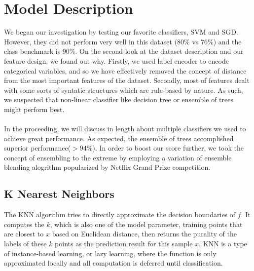 \documentclass[conference]{IEEEtran}
\begin{document}
\newcommand{\vh}{\mathbf{h}}

\section{Model Description}
We began our investigation by testing our favorite classifiers, SVM and SGD. However, they did not perform very well in this dataset (80\% vs 76\%) and the class benchmark is 90\%. On the second look at the dataset description and our feature design, we found out why. Firstly, we used label encoder to encode categorical variables, and so we have effectively removed the concept of distance from the most important features of the dataset. Secondly, most of features dealt with some sorts of syntatic structures which are rule-based by nature. As such, we suspected that non-linear classifier like decision tree or ensemble of trees might perform best. \\ \\
In the proceeding, we will discuss in length about multiple classifiers we used to achieve great performance. As expected, the ensemble of trees accomplished superior performance($> 94$\%). In order to boost our score further, we took the concept of ensembling to the extreme by employing a variation of ensemble blending alogrithm popularized by Netflix Grand Prize competition.

\subsection{K Nearest Neighbors}
The KNN algorithm tries to directly approximate the decision boundaries of $f$. It computes the $k$, which is also one of the model parameter, training points that are closest to $x$ based on Euclidean distance, then returns the purality of the labels of these $k$ points as the prediction result for this sample $x$. KNN is a type of instance-based learning, or lazy learning, where the function is only approximated locally and all computation is deferred until classification.
\end{document}

